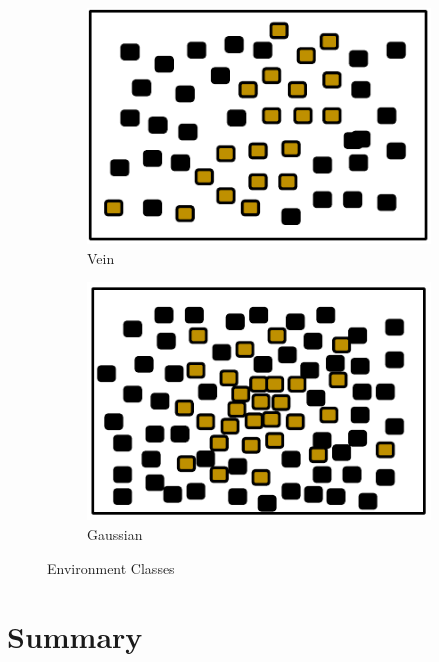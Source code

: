 \begin{figure} [h]
\begin{subfigure}[b]{0.2\textwidth}
                \includegraphics[width=\textwidth]{chapters/chapter4/figures/veinenv.pdf}
                \caption{Vein}
                \label{fig:veinenv}
        \end{subfigure}  
        \begin{subfigure}[b]{0.2\textwidth}
                        \includegraphics[width=\textwidth]{chapters/chapter4/figures/gaussianenv}
                        \caption{Gaussian}
                        \label{fig:gaussianenv}
       \end{subfigure}
        \caption{Environment Classes}\label{fig:environments}
\end{figure}


\section{Summary}
\label{third:summary}


